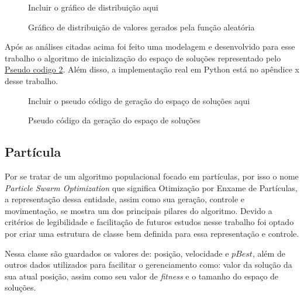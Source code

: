                 \begin{figure}[ht]
                    \centering
                    \small{Incluir o gráfico de distribuição aqui}
                    \caption{Gráfico de distribuição de valores gerados pela função aleatória}
                    \label{fig:distrib-uniforme}
                \end{figure}
                

            Após as análises citadas acima foi feito uma modelagem e desenvolvido para esse trabalho o algoritmo de inicialização do espaço de soluções representado pelo 
            \hyperref[fig:pseudocodigo-solutionspace]{Pseudo codigo \ref{fig:pseudocodigo-solutionspace}}. 
            Além disso, a implementação real em Python está no apêndice x desse trabalho.\hfill

            \begin{figure}[ht]
                \centering
                \small{Incluir o pseudo código de geração do espaço de soluções aqui}
                \caption{Pseudo código da geração do espaço de soluções}
                \label{fig:pseudocodigo-solutionspace}
            \end{figure}
        


    \subsection{Partícula}
            Por se tratar de um algoritmo populacional focado em partículas, por isso o nome \textit{Particle Swarm Optimization} que significa Otimização por Enxame de Partículas, a representação dessa entidade, assim como sua geração, controle e movimentação, se mostra um dos principais pilares do algoritmo. Devido a critérios de legibilidade e facilitação de futuros estudos nesse trabalho foi optado por criar uma estrutura de classe bem definida para essa representação e controle.
        

            Nessa classe são guardados os valores de: posição, velocidade e $pBest$, além de outros dados utilizados para facilitar o gerenciamento como: valor da solução da sua atual posição, assim como seu valor de \textit{fitness} e o tamanho do espaço de soluções.\hfill\vspace{\onelineskip}

